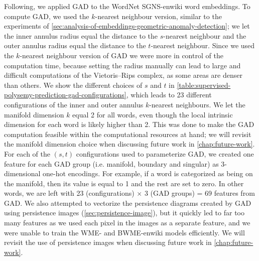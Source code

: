 Following, we applied GAD to the WordNet SGNS-enwiki word embeddings. To compute GAD, we used the $k$-nearest neighbour version, similar to the experiments of \cref{sec:analysis-of-embeddings-geometric-anomaly-detection}; we let the inner annulus radius equal the distance to the $s$-nearest neighbour and the outer annulus radius equal the distance to the $t$-nearest neighbour. Since we used the $k$-nearest neighbour version of GAD we were more in control of the computation time, because setting the radius manually can lead to large and difficult computations of the Vietoris–Rips complex, as some areas are denser than others. We show the different choices of $s$ and $t$ in \cref{table:supervised-polysemy-prediction-gad-configurations}, which leads to 23 different configurations of the inner and outer annulus $k$-nearest neighbours. We let the manifold dimension $k$ equal 2 for all words, even though the local intrinsic dimension for each word is likely higher than 2. This was done to make the GAD computation feasible within the computational resources at hand; we will revisit the manifold dimension choice when discussing future work in \cref{chap:future-work}. For each of the $(s, t)$ configurations used to parameterize GAD, we created one feature for each GAD group (i.e. manifold, boundary and singular) as 3-dimensional one-hot encodings. For example, if a word is categorized as being on the manifold, then its value is equal to 1 and the rest are set to zero. In other words, we are left with 23 (configurations) $\times$ 3 (GAD groups) = 69 features from GAD. We also attempted to vectorize the persistence diagrams created by GAD using persistence images (\cref{sec:persistence-image}), but it quickly led to far too many features as we used each pixel in the images as a separate feature, and we were unable to train the WME- and BWME-enwiki models efficiently. We will revisit the use of persistence images when discussing future work in \cref{chap:future-work}.
